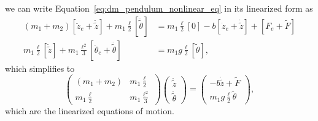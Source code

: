 we can write Equation~\eqref{eq:dm_pendulum_nonlinear_eq}
 in its linearized form as
\begin{align*}
(m_1+m_2)[\ddot{z}_e+\ddot{\tilde{z}}] + m_1 \frac{\ell}{2} [\ddot{\tilde{\theta}}]  &=
	 m_1 \frac{\ell}{2} [ 0 ] -b[\dot{z}_e+\dot{\tilde{z}}] + [F_e+\tilde{F}] 
	  \\
m_1 \frac{\ell}{2} [ \ddot{\tilde{z}}] +  m_1 \frac{\ell^2}{3} [\ddot{\theta}_e+\ddot{\tilde{\theta}}] &=
	m_1 g \frac{\ell}{2} [\tilde{\theta}],
\end{align*}
which simplifies to
\begin{equation}\label{eq:pendulum_linearized_eom}
\begin{pmatrix} (m_1+m_2) & m_1 \frac{\ell}{2} \\
m_1 \frac{\ell}{2} & m_1 \frac{\ell^2}{3} \end{pmatrix}\begin{pmatrix}
\ddot{\tilde{z}} \\ \ddot{\tilde{\theta}} \end{pmatrix}  =
\begin{pmatrix} -b\dot{\tilde{z}} + \tilde{F} 
	  \\
	m_1 g \frac{\ell}{2} \tilde{\theta} \end{pmatrix},
\end{equation}
which are the linearized equations of motion.
